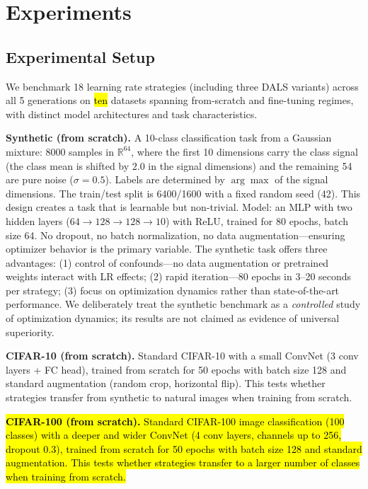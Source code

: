 \documentclass[a4paper,fleqn]{cas-dc}
\begin{document}
\section{Experiments}\label{sec:experiments}

\subsection{Experimental Setup}

We benchmark 18 learning rate strategies (including three DALS variants) across all 5 generations on \hl{ten} datasets spanning from-scratch and fine-tuning regimes, with distinct model architectures and task characteristics.

\textbf{Synthetic (from scratch).} A 10-class classification task from a Gaussian mixture: 8000 samples in $\mathbb{R}^{64}$, where the first 10 dimensions carry the class signal (the class mean is shifted by $2.0$ in the signal dimensions) and the remaining 54 are pure noise ($\sigma = 0.5$). Labels are determined by $\arg\max$ of the signal dimensions. The train/test split is 6400/1600 with a fixed random seed (42). This design creates a task that is learnable but non-trivial. Model: an MLP with two hidden layers ($64\to128\to128\to10$) with ReLU, trained for 80 epochs, batch size 64. No dropout, no batch normalization, no data augmentation---ensuring optimizer behavior is the primary variable. The synthetic task offers three advantages: (1) control of confounds---no data augmentation or pretrained weights interact with LR effects; (2) rapid iteration---80 epochs in 3--20 seconds per strategy; (3) focus on optimization dynamics rather than state-of-the-art performance. We deliberately treat the synthetic benchmark as a \emph{controlled} study of optimization dynamics; its results are not claimed as evidence of universal superiority.

\textbf{CIFAR-10 (from scratch).} Standard CIFAR-10 with a small ConvNet (3 conv layers + FC head), trained from scratch for 50 epochs with batch size 128 and standard augmentation (random crop, horizontal flip). This tests whether strategies transfer from synthetic to natural images when training from scratch.

\hl{\textbf{CIFAR-100 (from scratch).} Standard CIFAR-100 image classification (100 classes) with a deeper and wider ConvNet (4 conv layers, channels up to 256, dropout 0.3), trained from scratch for 50 epochs with batch size 128 and standard augmentation. This tests whether strategies transfer to a larger number of classes when training from scratch.}
\end{document}
